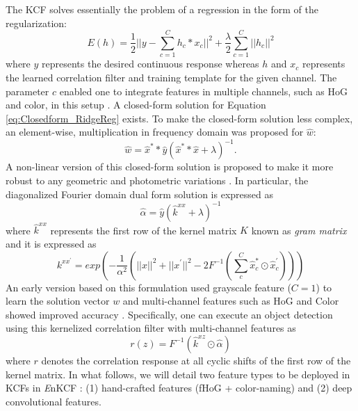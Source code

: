 \documentclass[10pt,twocolumn,letterpaper]{article}
\begin{document}
The KCF solves essentially the problem of a regression in the form of
the regularization:
\begin{equation}
E(h) = \frac{1}{2}||y-\sum_{c=1}^{C}h_{c}*x_{c}||^{2} + \frac{\lambda}{2}\sum_{c=1}^{C}||h_{c}||^{2}
\label{eq:Closedform_RidgeReg}
\end{equation}
where $y$ represents the desired continuous response whereas $h$ and
$x_{c}$ represents the learned correlation filter and training
template for the given channel. The parameter $c$ enabled one to
integrate features in multiple channels, such as HoG and color, in
this setup \cite{henriques2015high,galoogahi2013multi}. A closed-form
solution for Equation \ref{eq:Closedform_RidgeReg} exists. To make the
closed-form solution less complex, an element-wise, multiplication in
frequency domain was proposed for $\hat{w}$:
\begin{equation}
\hat{w} = \hat{x}^{*}*\hat{y}(\hat{x}^{*}*\hat{x}+\lambda)^{-1}.
\label{eq:DiagonalizedPrimalSolution}
\end{equation}
A non-linear version of this closed-form solution is proposed to make
it more robust to any geometric and photometric variations
\cite{henriques2015high}. In particular, the diagonalized Fourier
domain dual form solution is expressed as
\begin{equation}
\hat{\alpha} = \hat{y}(\hat{k}^{xx}+\lambda)^{-1}
\label{eq:FourierDualDomainSolution}
\end{equation}
where $\hat{k}^{xx}$ represents the first row of the kernel matrix $K$
known as \textit{gram matrix} and it is expressed as
\begin{equation}
k^{xx^{'}} = exp(-\dfrac{1}{\alpha^{2}}(||x||^{2}+||x^{'}||^{2}-2F^{-1}(\sum^{C}_{c}\hat{x}_{c}^{*}\odot \hat{x}_{c}^{'})))
\label{eq:GaussianCorrelationSingleChannel}
\end{equation}
An early version based on this formulation used grayscale feature
($C=1$) to learn the solution vector $w$ and multi-channel features
such as HoG and Color showed improved accuracy
\cite{henriques2015high,galoogahi2013multi,tang2015multi,ma2015long,bibi2015multi}. Specifically,
one can execute an object detection using this kernelized correlation
filter with multi-channel features as
\begin{equation}
r(z) = F^{-1}(\hat{k}^{xz} \odot \hat{\alpha})
\end{equation}
where $r$ denotes the correlation response at all cyclic shifts of the
first row of the kernel matrix. In what follows, we will detail two feature types to be deployed
in KCFs in {\it E}nKCF : (1) hand-crafted features (fHoG + color-naming) and (2) deep convolutional features.
\end{document}
